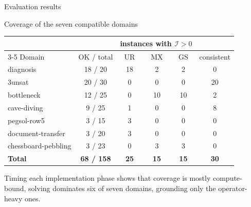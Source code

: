 \begin{frame}{Evaluation results}
    \begin{exampleblock}{Coverage of the seven compatible domains}
        \centering\small
        \begin{tabular}{l c ccc c}
            \toprule
                                &                   & \multicolumn{3}{c}{instances with $\mathcal{I} > 0$} &                                         \\
            \cmidrule(lr){3-5}
            Domain              & OK / total        & UR                                                   & MX          & GS          & consistent  \\
            \midrule
            diagnosis           & 18 / 20           & 18                                                   & 2           & 2           & 0           \\
            3unsat              & 20 / 30           & 0                                                    & 0           & 0           & 20          \\
            bottleneck          & 12 / 25           & 0                                                    & 10          & 10          & 2           \\
            cave-diving         & 9 / 25            & 1                                                    & 0           & 0           & 8           \\
            pegsol-row5         & 3 / 15            & 3                                                    & 0           & 0           & 0           \\
            document-transfer   & 3 / 20            & 3                                                    & 0           & 0           & 0           \\
            chessboard-pebbling & 3 / 23            & 0                                                    & 3           & 3           & 0           \\
            \midrule
            \textbf{Total}      & \textbf{68 / 158} & \textbf{25}                                          & \textbf{15} & \textbf{15} & \textbf{30} \\
            \bottomrule
        \end{tabular}
    \end{exampleblock}

    {\footnotesize Timing each implementation phase shows that coverage is mostly compute-bound, solving dominates six of seven domains, grounding only the operator-heavy ones.}

\end{frame}

